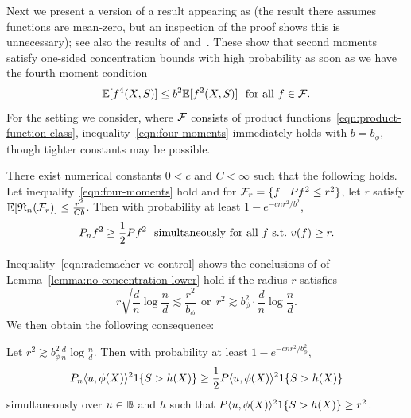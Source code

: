 \documentclass[11pt]{article}
\newcommand{\radphi}{b_{\phi}}
\newcommand{\scorerv}{S}
\begin{document}
Next we present a version of a result appearing as \cite[Theorem
  14.12]{Wainwright19} (the result there assumes functions are mean-zero,
but an inspection of the proof shows this is unnecessary); see also the
results of \cite{Mendelson14} and~\cite[Proof of Proposition
  1]{DuchiRu18a}. These show that second moments satisfy one-sided
concentration bounds with high probability as soon as
we have the fourth moment condition
\begin{equation}
  \label{eqn:four-moments}
  \E[f^4(X, \scorerv)] \le b^2 \E[f^2(X, \scorerv)]
  ~~ \mbox{for~all~} f \in \mc{F}.
\end{equation}
For the setting we consider, where $\mathcal{F}$ consists
of product functions~\eqref{eqn:product-function-class},
inequality~\eqref{eqn:four-moments} immediately
holds with $b = \radphi$, though tighter constants may be possible.
\begin{lemma}
  \label{lemma:no-concentration-lower}
  There exist numerical constants $0 < c$ and $C < \infty$ such that
  the following holds. Let inequality~\eqref{eqn:four-moments} hold and
  for $\mathcal{F}_r = \{f \mid Pf^2 \le r^2\}$, let
  $r$ satisfy $\mathbb{E}[\mathfrak{R}_n(\mathcal{F}_r)] \le \frac{r^2}{C b}$. Then
  with probability at least $1 - e^{-c n r^2 / b^2}$,
  \begin{equation*}
    P_n f^2 \ge \frac{1}{2} P f^2
    ~~ \mbox{simultaneously~for~all~} f
    ~ \mbox{s.t.}~ v(f) \ge r.
  \end{equation*}
\end{lemma}

Inequality~\eqref{eqn:rademacher-vc-control} shows the conclusions of
of Lemma~\ref{lemma:no-concentration-lower} hold if the radius $r$
satisfies
\begin{equation*}
  r \sqrt{\frac{d}{n} \log \frac{n}{d}}
  \lesssim \frac{r^2}{\radphi}
  ~~ \mbox{or} ~~
  r^2 \gtrsim \radphi^2 \cdot \frac{d}{n} \log \frac{n}{d}.
\end{equation*}
We then obtain the following consequence:
\begin{lemma}
  \label{lemma:specialize-no-concentration}
  Let $r^2 \gtrsim \radphi^2 \frac{d}{n} \log \frac{n}{d}$.
  Then with probability at least $1 - e^{-c n r^2 / \radphi^2}$,
  \begin{equation*}
    P_n\<u, \phi(X)\>^2 \indic{\scorerv > h(X)}
    \ge \half P\<u, \phi(X)\>^2 \indic{\scorerv > h(X)}
  \end{equation*}
  simultaneously over $u \in \mathbb{B}$ and $h$ such that
  $P\<u, \phi(X)\>^2 \indic{\scorerv > h(X)} \ge r^2$.
\end{lemma}
\end{document}
